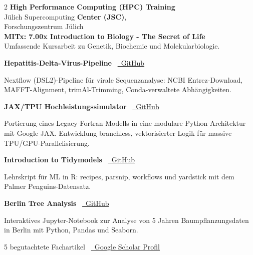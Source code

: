 \documentclass{thejus_cv}
\begin{document}
\begin{paracol}{2}
\textbf{High Performance Computing (HPC) Training}\\
J\"ulich Supercomputing \textbf{Center (JSC)},\\
Forschungszentrum J\"ulich\\[0.3cm]

\textbf{MITx: 7.00x Introduction to Biology - The Secret of Life}\\
{\small Umfassende Kursarbeit zu Genetik, Biochemie und Molekularbiologie.}\\[0.4cm]


\textbf{Hepatitis-Delta-Virus-Pipeline} \textbullet\ \href{https://github.com/thejusmahajan/hepatitis-delta-pipeline}{\faGithub\ GitHub}\par
{\small Nextflow (DSL2)-Pipeline f\"ur virale Sequenzanalyse: NCBI Entrez-Download, MAFFT-Alignment, trimAl-Trimming, Conda-verwaltete Abh\"angigkeiten.}\par
\vspace{0.3em}

\textbf{JAX/TPU Hochleistungssimulator} \textbullet\ \href{https://github.com/thejusmahajan/Agent_Based_Phytoplankton_Model-IBM-Phytoplankton}{\faGithub\ GitHub}\par
{\small Portierung eines Legacy-Fortran-Modells in eine modulare Python-Architektur mit Google JAX. Entwicklung branchless, vektorisierter Logik f\"ur massive TPU/GPU-Parallelisierung.}\par
\vspace{0.3em}

\textbf{Introduction to Tidymodels} \textbullet\ \href{https://github.com/thejusmahajan/Introduction_to_Tidymodels}{\faGithub\ GitHub}\par
{\small Lehrskript f\"ur ML in R: recipes, parsnip, workflows und yardstick mit dem Palmer Penguins-Datensatz.}\par
\vspace{0.3em}

\textbf{Berlin Tree Analysis} \textbullet\ \href{https://github.com/thejusmahajan/berlin-tree-analysis}{\faGithub\ GitHub}\par
{\small Interaktives Jupyter-Notebook zur Analyse von 5 Jahren Baumpflanzungsdaten in Berlin mit Python, Pandas und Seaborn.}\par
\vspace{0.4em}


5 begutachtete Fachartikel \textbullet\ \href{https://scholar.google.com/citations?user=PJkZwAwAAAAJ}{\faGraduationCap\ Google Scholar Profil}




\end{paracol}
\end{document}
